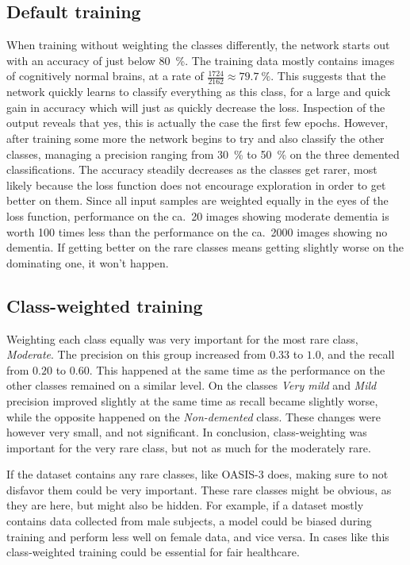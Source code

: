 \documentclass{kththesis}
\newcommand{\num}[1]{{#1}}
\begin{document}
\subsection{Default training}
When training without weighting the classes differently, the network starts out with an accuracy of just below 80~\%. The training data mostly contains images of cognitively normal brains, at a rate of $\frac{1724}{2162} \approx 79.7~\%$. This suggests that the network quickly learns to classify everything as this class, for a large and quick gain in accuracy which will just as quickly decrease the loss. Inspection of the output reveals that yes, this is actually the case the first few epochs. However, after training some more the network begins to try and also classify the other classes, managing a precision ranging from 30~\% to 50~\% on the three demented classifications. The accuracy steadily decreases as the classes get rarer, most likely because the loss function does not encourage exploration in order to get better on them. Since all input samples are weighted equally in the eyes of the loss function, performance on the ca.\ 20 images showing moderate dementia is worth 100 times less than the performance on the ca.\ \num{2000} images showing no dementia. If getting better on the rare classes means getting slightly worse on the dominating one, it won't happen.

\subsection{Class-weighted training}
Weighting each class equally was very important for the most rare class, \textit{Moderate}. The precision on this group increased from $0.33$ to $1.0$, and the recall from $0.20$ to $0.60$. This happened at the same time as the performance on the other classes remained on a similar level. On the classes \textit{Very mild} and \textit{Mild} precision improved slightly at the same time as recall became slightly worse, while the opposite happened on the \textit{Non-demented} class. These changes were however very small, and not significant. In conclusion, class-weighting was important for the very rare class, but not as much for the moderately rare.

If the dataset contains any rare classes, like OASIS-3 does, making sure to not disfavor them could be very important. These rare classes might be obvious, as they are here, but might also be hidden. For example, if a dataset mostly contains data collected from male subjects, a model could be biased during training and perform less well on female data, and vice versa. In cases like this 
class-weighted training could be essential for fair healthcare.
\end{document}
